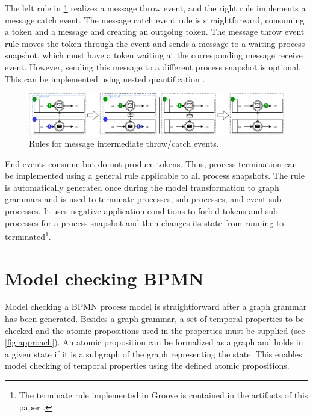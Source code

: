\documentclass[submission, copyright, creativecommons]{eptcs}
\begin{document}
The left rule in \cref{fig:messageEventRules} realizes a message throw event, and the right rule implements a message catch event.
The message catch event rule is straightforward, consuming a token and a message and creating an outgoing token.
The message throw event rule moves the token through the event and sends a message to a waiting process snapshot, which must have a token waiting at the corresponding message receive event.
However, sending this message to a different process snapshot is optional.
This can be implemented using nested quantification \cite{rensinkNestedQuantificationGraph2006}.

\begin{figure}[h]
    \centering
    \includegraphics[width=1\textwidth]{images/bpmn_semantics-message-events.pdf}
    \caption{Rules for message intermediate throw/catch events.}
    \label{fig:messageEventRules}
\end{figure}

End events consume but do not produce tokens.
Thus, process termination can be implemented using a general rule applicable to all process snapshots.
The rule is automatically generated once during the model transformation to graph grammars and is used to terminate processes, sub processes, and event sub processes.
It uses negative-application conditions to forbid tokens and sub processes for a process snapshot and then changes its state from running to terminated\footnote{The terminate rule implemented in Groove is contained in the artifacts of this paper \cite{timkrauterArtifactsTERMGRAPH2022}.}.

\section{Model checking BPMN} \label{sec:modelChecking}

Model checking a BPMN process model is straightforward after a graph grammar has been generated.
Besides a graph grammar, a set of temporal properties to be checked and the atomic propositions used in the properties must be supplied (see \cref{fig:approach}).
An atomic proposition can be formalized as a graph and holds in a given state if it is a subgraph of the graph representing the state.
This enables model checking of temporal properties using the defined atomic propositions.
\end{document}
